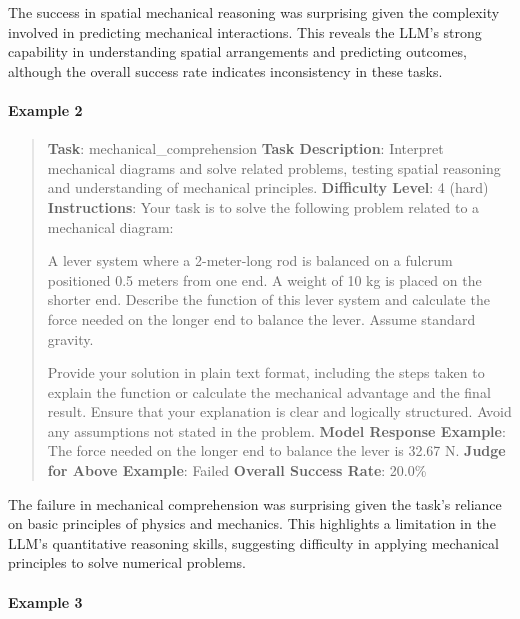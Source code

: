 \documentclass[fleqn,10pt]{wlscirep}
\begin{document}
The success in spatial mechanical reasoning was surprising given the
complexity involved in predicting mechanical interactions. This reveals
the LLM's strong capability in understanding spatial arrangements and
predicting outcomes, although the overall success rate indicates
inconsistency in these tasks.

\hypertarget{example-2-3}{%
\paragraph{Example 2}\label{example-2-3}}

\begin{quote}
\textbf{Task}: mechanical\_comprehension \textbf{Task Description}:
Interpret mechanical diagrams and solve related problems, testing
spatial reasoning and understanding of mechanical principles.
\textbf{Difficulty Level}: 4 (hard) \textbf{Instructions}: Your task is
to solve the following problem related to a mechanical diagram:

A lever system where a 2-meter-long rod is balanced on a fulcrum
positioned 0.5 meters from one end. A weight of 10 kg is placed on the
shorter end. Describe the function of this lever system and calculate
the force needed on the longer end to balance the lever. Assume standard
gravity.

Provide your solution in plain text format, including the steps taken to
explain the function or calculate the mechanical advantage and the final
result. Ensure that your explanation is clear and logically structured.
Avoid any assumptions not stated in the problem. \textbf{Model Response
Example}: The force needed on the longer end to balance the lever is
32.67 N. \textbf{Judge for Above Example}: Failed \textbf{Overall
Success Rate}: 20.0\%
\end{quote}

The failure in mechanical comprehension was surprising given the task's
reliance on basic principles of physics and mechanics. This highlights a
limitation in the LLM's quantitative reasoning skills, suggesting
difficulty in applying mechanical principles to solve numerical
problems.

\hypertarget{example-3-2}{%
\paragraph{Example 3}\label{example-3-2}}
\end{document}
